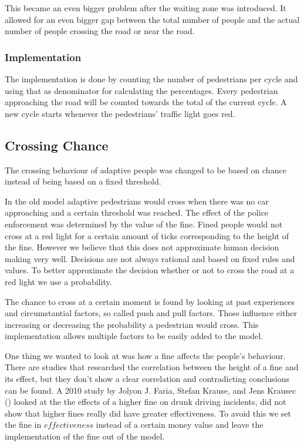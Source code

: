 \documentclass[a4paper]{article}
\begin{document}
This became an even bigger problem after the waiting zone was introduced. It allowed for an even bigger gap between the total number of people and the actual number of people crossing the road or near the road.

\subsubsection{Implementation}
The implementation is done by counting the number of pedestrians per cycle and using that as denominator for calculating the percentages. Every pedestrian approaching the road will be counted towards the total of the current cycle. A new cycle starts whenever the pedestrians' traffic light goes red.


\subsection{Crossing Chance}
The crossing behaviour of adaptive people was changed to be based on chance instead of being based on a fixed threshold.

In the old model adaptive pedestrians would cross when there was no car approaching and a certain threshold was reached. The effect of the police enforcement was determined by the value of the fine. Fined people would not cross at a red light for a certain amount of ticks corresponding to the height of the fine. However we believe that this does not approximate human decision making very well. Decisions are not always rational and based on fixed rules and values. To better approximate the decision whether or not to cross the road at a red light we use a probability. 

The chance to cross at a certain moment is found by looking at past experiences and circumstantial factors, so called push and pull factors. Those influence either increasing or decreasing the probability a pedestrian would cross. This implementation allows multiple factors to be easily added to the model.


One thing we wanted to look at was how a fine affects the people's behaviour. There are studies that researched the correlation between the height of a fine and its effect, but they don't show a clear correlation and contradicting conclusions can be found. A 2010 study by Jolyon J. Faria, Stefan Krause, and Jens Krausec (\cite{drunkdrivers}) looked at the the effects of a higher fine on drunk driving incidents, did not show that higher fines really did have greater effectiveness. To avoid this we set the fine in $effectiveness$ instead of a certain money value and leave the implementation of the fine out of the model. 
\end{document}
